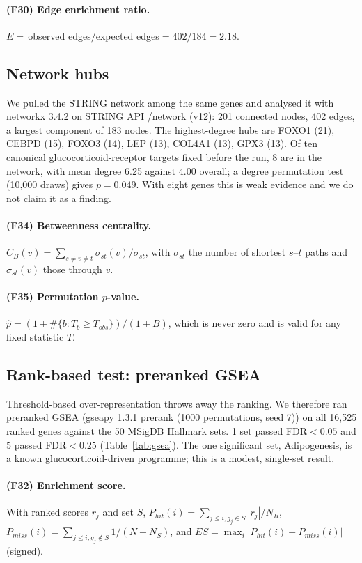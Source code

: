 \paragraph{(F30) Edge enrichment ratio.} $E=\,$observed edges$/$expected edges$=402/184=2.18$.
\subsection{Network hubs}
We pulled the STRING network among the same genes and analysed it with networkx 3.4.2 on STRING API /network (v12): 201 connected nodes, 402 edges, a largest component of 183 nodes. The highest-degree hubs are FOXO1 (21), CEBPD (15), FOXO3 (14), LEP (13), COL4A1 (13), GPX3 (13). Of ten canonical glucocorticoid-receptor targets fixed before the run, 8 are in the network, with mean degree 6.25 against 4.00 overall; a degree permutation test (10,000 draws) gives $p=0.049$. With eight genes this is weak evidence and we do not claim it as a finding.
\paragraph{(F34) Betweenness centrality.} $C_B(v)=\sum_{s\ne v\ne t}\sigma_{st}(v)/\sigma_{st}$, with $\sigma_{st}$ the number of shortest $s$--$t$ paths and $\sigma_{st}(v)$ those through $v$.
\paragraph{(F35) Permutation $p$-value.} $\hat p=(1+\#\{b: T_b\ge T_{obs}\})/(1+B)$, which is never zero and is valid for any fixed statistic $T$.
\subsection{Rank-based test: preranked GSEA}
Threshold-based over-representation throws away the ranking. We therefore ran preranked GSEA (gseapy 1.3.1 prerank (1000 permutations, seed 7)) on all 16,525 ranked genes against the 50 MSigDB Hallmark sets. 1 set passed FDR$<0.05$ and 5 passed FDR$<0.25$ (Table~\ref{tab:gsea}). The one significant set, Adipogenesis, is a known glucocorticoid-driven programme; this is a modest, single-set result.
\paragraph{(F32) Enrichment score.} With ranked scores $r_j$ and set $S$, $P_{hit}(i)=\sum_{j\le i, g_j\in S}|r_j|/N_R$, $P_{miss}(i)=\sum_{j\le i, g_j\notin S}1/(N-N_S)$, and $ES=\max_i|P_{hit}(i)-P_{miss}(i)|$ (signed).
